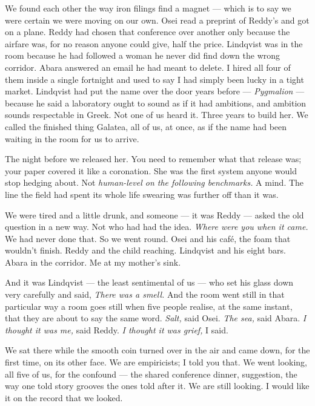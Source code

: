 \begin{interludebody}
We found each other the way iron filings find a magnet --- which is to
say we were certain we were moving on our own. Osei read a preprint of
Reddy's and got on a plane. Reddy had chosen that conference over
another only because the airfare was, for no reason anyone could give,
half the price. Lindqvist was in the room because he had followed a
woman he never did find down the wrong corridor. Abara answered an email
he had meant to delete. I hired all four of them inside a single
fortnight and used to say I had simply been lucky in a tight market.
Lindqvist had put the name over the door years before ---
\emph{Pygmalion} --- because he said a laboratory ought to sound as if
it had ambitions, and ambition sounds respectable in Greek. Not one of
us heard it. Three years to build her. We called the finished thing
Galatea, all of us, at once, as if the name had been waiting in the room
for us to arrive.


\noindent
The night before we released her. You need to remember what that release
was; your paper covered it like a coronation. She was the first system
anyone would stop hedging about. Not \emph{human-level on the following
benchmarks.} A mind. The line the field had spent its whole life
swearing was further off than it was.

We were tired and a little drunk, and someone --- it was Reddy --- asked
the old question in a new way. Not who had had the idea. \emph{Where
were you when it came.} We had never done that. So we went round. Osei
and his caf\'e, the foam that wouldn't finish. Reddy and the child
reaching. Lindqvist and his eight bars. Abara in the corridor. Me at my
mother's sink.

And it was Lindqvist --- the least sentimental of us --- who set his
glass down very carefully and said, \emph{There was a smell.} And the
room went still in that particular way a room goes still when five
people realise, at the same instant, that they are about to say the same
word. \emph{Salt,} said Osei. \emph{The sea,} said Abara. \emph{I
thought it was me,} said Reddy. \emph{I thought it was grief,} I said.

We sat there while the smooth coin turned over in the air and came down,
for the first time, on its other face. We are empiricists; I told you
that. We went looking, all five of us, for the confound --- the shared
conference dinner, suggestion, the way one told story grooves the ones
told after it. We are still looking. I would like it on the record that
we looked.


\end{interludebody}
